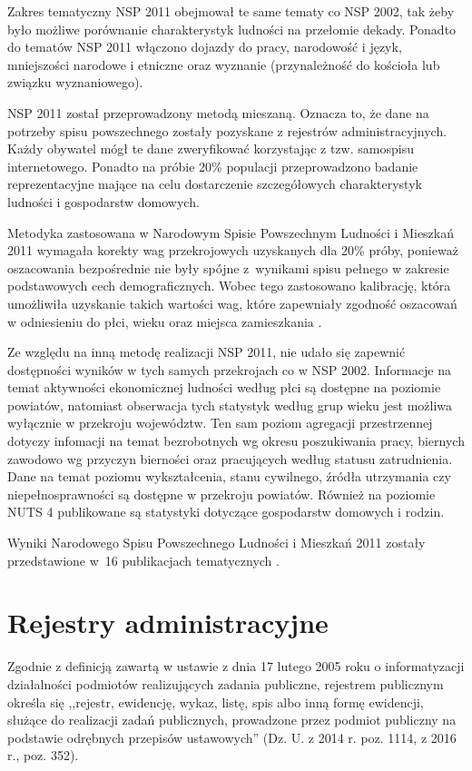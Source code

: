 Zakres tematyczny NSP 2011 obejmował te same tematy co NSP 2002, tak żeby było możliwe porównanie charakterystyk ludności na przełomie dekady. Ponadto do tematów NSP 2011 włączono dojazdy do pracy, narodowość i język, mniejszości narodowe i etniczne oraz wyznanie (przynależność do kościoła lub związku wyznaniowego).

NSP 2011 został przeprowadzony metodą mieszaną. Oznacza to, że dane na potrzeby spisu powszechnego zostały pozyskane z rejestrów administracyjnych. Każdy obywatel mógł te dane zweryfikować korzystając z tzw. samospisu internetowego. Ponadto na próbie 20\% populacji przeprowadzono badanie reprezentacyjne mające na celu dostarczenie szczegółowych charakterystyk ludności i gospodarstw domowych. 

Metodyka zastosowana w Narodowym Spisie Powszechnym Ludności i Mieszkań 2011 wymagała korekty wag przekrojowych uzyskanych dla 20\% próby, ponieważ oszacowania bezpośrednie nie były spójne z~wynikami spisu pełnego w zakresie podstawowych cech demograficznych. Wobec tego zastosowano kalibrację, która umożliwiła uzyskanie takich wartości wag, które zapewniały zgodność oszacowań w odniesieniu do płci, wieku oraz miejsca zamieszkania \citep{szymkowiak2014}.

Ze względu na inną metodę realizacji NSP 2011, nie udało się zapewnić dostępności wyników w tych samych przekrojach co w NSP 2002. Informacje na temat aktywności ekonomicznej ludności według płci są dostępne na poziomie powiatów, natomiast obserwacja tych statystyk według grup wieku jest możliwa wyłącznie w przekroju województw. Ten sam poziom agregacji przestrzennej dotyczy infomacji na temat bezrobotnych wg okresu poszukiwania pracy, biernych zawodowo wg przyczyn bierności oraz pracujących według statusu zatrudnienia. Dane na temat poziomu wykształcenia, stanu cywilnego, źródła utrzymania czy niepełnosprawności są dostępne w przekroju powiatów. Również na poziomie NUTS 4 publikowane są statystyki dotyczące gospodarstw domowych i rodzin.

Wyniki Narodowego Spisu Powszechnego Ludności i Mieszkań 2011 zostały przedstawione w~16 publikacjach tematycznych \citep{gus2012}.

\section{Rejestry administracyjne}

Zgodnie z definicją zawartą w ustawie z dnia 17 lutego 2005 roku o informatyzacji działalności podmiotów realizujących zadania publiczne, rejestrem publicznym określa się ,,rejestr, ewidencję, wykaz, listę, spis albo inną formę ewidencji, służące do realizacji zadań publicznych, prowadzone przez podmiot publiczny na podstawie odrębnych przepisów ustawowych'' (Dz. U. z 2014 r. poz. 1114, z 2016 r., poz. 352).

